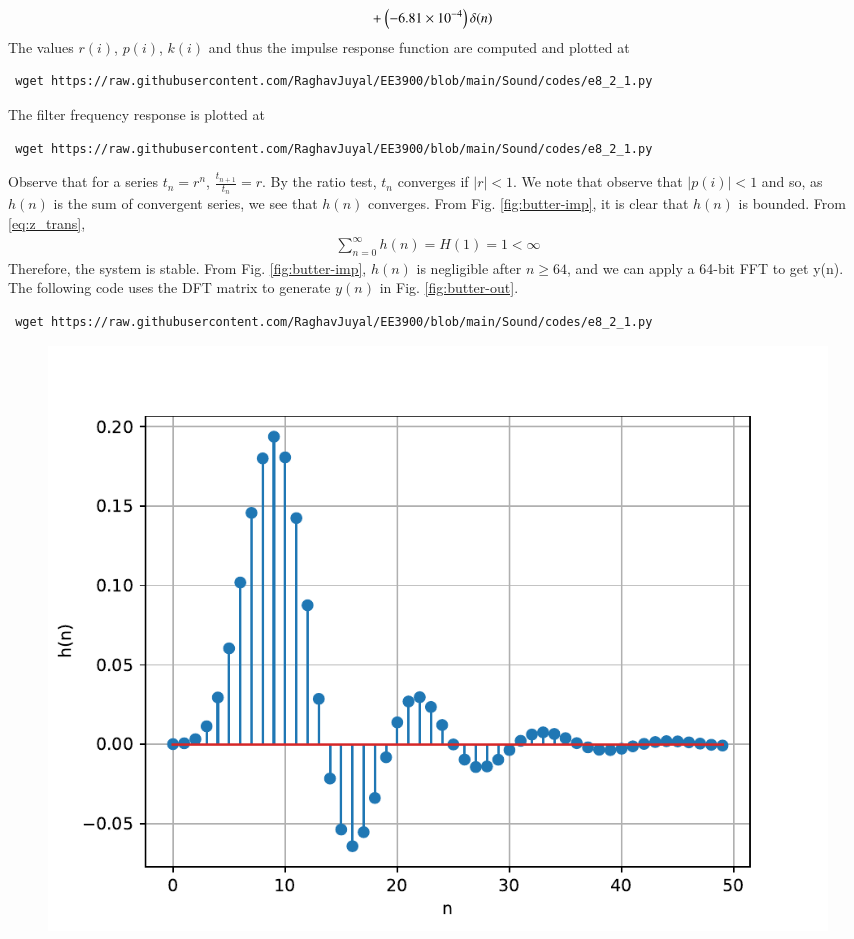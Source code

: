 \documentclass[journal,12pt,twocolumn]{IEEEtran}
\renewcommand\thesection{\arabic{section}}
\begin{document}
\begin{enumerate}[label=\thesection.\arabic*]
\begin{align}
		&+ \left(-6.81 \times 10^{-4}\right)\delta(n)
	\end{align}
	The values $r(i)$, $p(i)$, $k(i)$ and thus the impulse response function are computed and plotted at
	\begin{lstlisting}
 wget https://raw.githubusercontent.com/RaghavJuyal/EE3900/blob/main/Sound/codes/e8_2_1.py
	\end{lstlisting}
	The filter frequency response is plotted at
	\begin{lstlisting}
 wget https://raw.githubusercontent.com/RaghavJuyal/EE3900/blob/main/Sound/codes/e8_2_1.py
	\end{lstlisting}
	Observe that for a series $t_n = r^n$, $\frac{t_{n + 1}}{t_n} = r$.
	By the ratio test, $t_n$ converges if $|r| < 1$. We note that
	observe that $|p(i)| < 1$ and so, as $h(n)$ is the sum of convergent series,
	we see that $h(n)$ converges. From Fig. \eqref{fig:butter-imp}, it is clear
	that $h(n)$ is bounded. From \eqref{eq:z_trans},
	\begin{align}
		\sum_{n = 0}^{\infty}h(n) = H(1) = 1 < \infty
	\end{align}
	Therefore, the system is stable. From
	Fig. \eqref{fig:butter-imp}, $h(n)$ is negligible after $n \geq 64$, and we
	can apply a 64-bit FFT to get y(n). The following code uses the DFT matrix
	to generate $y(n)$ in Fig. \eqref{fig:butter-out}.
	\begin{lstlisting}
 wget https://raw.githubusercontent.com/RaghavJuyal/EE3900/blob/main/Sound/codes/e8_2_1.py
	\end{lstlisting}
	\begin{figure}[!htb]
		\includegraphics[width=\columnwidth]{figs/prob_7-2-1.pdf}

\end{figure}
\end{enumerate}
\end{document}
